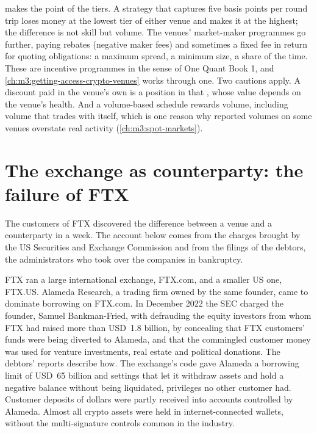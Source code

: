  makes the point of the tiers. A strategy that captures five
basis points per round trip loses money at the lowest tier of either venue and makes it at the highest;
the difference is not skill but volume. The venues' market-maker programmes go further, paying rebates
(negative maker fees) and sometimes a fixed fee in return for quoting obligations: a maximum spread, a
minimum size, a share of the time. These are incentive programmes in the sense of One Quant Book 1, and
\cref{ch:m3:getting-access-crypto-venues} works through one. Two cautions apply. A discount paid in the
venue's own  is a position in that , whose value depends on the venue's health. And a
volume-based schedule rewards volume, including volume that trades with itself, which is one reason why
reported volumes on some venues overstate real activity (\cref{ch:m3:spot-markets}).

\section{The exchange as counterparty: the failure of FTX}

The customers of FTX discovered the difference between a venue and a counterparty in a week. The account
below comes from the charges brought by the US Securities and Exchange Commission and from the filings of
the debtors, the administrators who took over the companies in bankruptcy.

FTX ran a large international exchange, FTX.com, and a smaller US one, FTX.US. Alameda Research, a
trading firm owned by the same founder, came to dominate borrowing on FTX.com. In December 2022
the SEC charged the founder, Samuel Bankman-Fried, with defrauding the equity investors from whom FTX had
raised more than USD~1.8 billion, by concealing that FTX customers' funds were being diverted to Alameda,
and that the commingled customer money was used for venture investments, real estate and political
donations. The debtors' reports describe how. The exchange's code gave Alameda a borrowing limit of USD~65
billion and settings that let it withdraw assets and hold a negative balance without being liquidated,
privileges no other customer had. Customer deposits of dollars were partly received into accounts
controlled by Alameda. Almost all crypto assets were held in internet-connected wallets, without the
multi-signature controls common in the industry.

